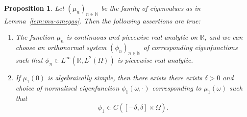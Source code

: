 \documentclass[a4paper, reqno]{amsart}
\numberwithin{equation}{section}
\theoremstyle{plain}
\newtheorem{proposition}[theorem]{Proposition}
\theoremstyle{definition}
\theoremstyle{remark}
\newcommand{\NN}{\mathbb{N}}
\newcommand{\RR}{\mathbb{R}}
\begin{document}
\begin{proposition}
  \label{prop:cont-phi-1}
  Let $(\mu_n)_{n\in\NN}$ be the family of eigenvalues as in Lemma~\ref{lem:mu-omegas}. Then the following assertions are true:
  \begin{enumerate}[\upshape (i)]
  \item The function $\mu_n$ is continuous and piecewise real analytic on $\RR$, and we can choose an orthonormal system $(\phi_n)_{n\in\NN}$ of corresponding eigenfunctions such that $\phi_n\in L^\infty(\RR, L^2(\Omega))$ is piecewise real analytic.
  \item If $\mu_1(0)$ is algebraically simple, then there exists there exists $\delta>0$ and choice of normalised eigenfunction $\phi_1(\omega,\cdot)$ corresponding to $\mu_1(\omega)$ such that
    \begin{equation*}
      \phi_1\in C([-\delta,\delta]\times\overline\Omega).
    \end{equation*}
  \end{enumerate}
\end{proposition}
\end{document}
